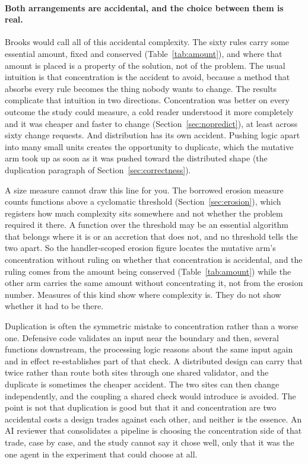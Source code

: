 \documentclass[11pt,a4paper]{article}
\begin{document}
\paragraph{Both arrangements are accidental, and the choice between them is
real.} Brooks would call all of this accidental complexity. The sixty rules carry
some essential amount, fixed and conserved (Table~\ref{tab:amount}), and where
that amount is placed is a property of the solution, not of the problem. The
usual intuition is that concentration is the accident to avoid, because a method
that absorbs every rule becomes the thing nobody wants to change. The results
complicate that intuition in two directions. Concentration was better on every
outcome the study could measure, a cold reader understood it more completely and
it was cheaper and faster to change (Section~\ref{sec:nopredict}), at least across
sixty change requests. And distribution has its own accident. Pushing logic apart
into many small units creates the opportunity to duplicate, which the mutative arm
took up as soon as it was pushed toward the distributed shape (the duplication
paragraph of Section~\ref{sec:correctness}).

A size measure cannot draw this line for you. The borrowed erosion measure counts
functions above a cyclomatic threshold (Section~\ref{sec:erosion}), which
registers how much complexity sits somewhere and not whether the problem required
it there. A function over the threshold may be an essential algorithm that belongs
where it is or an accretion that does not, and no threshold tells the two apart.
So the handler-scoped erosion figure locates the mutative arm's concentration
without ruling on whether that concentration is accidental, and the ruling comes from the amount
being conserved (Table~\ref{tab:amount}) while the other arm carries the same
amount without concentrating it, not from the erosion number. Measures of this
kind show where complexity is. They do not show whether it had to be there.

Duplication is often the symmetric mistake to concentration rather than a worse
one. Defensive code validates an input near the boundary and then, several
functions downstream, the processing logic reasons about the same input again and
in effect re-establishes part of that check. A distributed design can carry that
twice rather than route both sites through one shared validator, and the
duplicate is sometimes the cheaper accident. The two sites can then change
independently, and the coupling a shared check would introduce is avoided. The
point is not that duplication is good but that it and concentration are two
accidental costs a design trades against each other, and neither is the essence.
An AI reviewer that consolidates a pipeline is choosing the concentration side of
that trade, case by case, and the study cannot say it chose well, only that it
was the one agent in the experiment that could choose at all.
\end{document}
